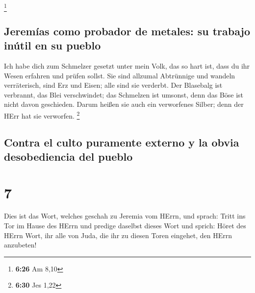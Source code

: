 \footnote{\textbf{6:26} Am 8,10}

\hypertarget{jeremuxedas-como-probador-de-metales-su-trabajo-inuxfatil-en-su-pueblo}{%
\subsection{Jeremías como probador de metales: su trabajo inútil en su
pueblo}\label{jeremuxedas-como-probador-de-metales-su-trabajo-inuxfatil-en-su-pueblo}}

 Ich habe dich zum Schmelzer gesetzt unter mein Volk, das
so hart ist, dass du ihr Wesen erfahren und prüfen sollst.
 Sie sind allzumal Abtrünnige und wandeln verräterisch,
sind Erz und Eisen; alle sind sie verderbt.  Der
Blasebalg ist verbrannt, das Blei verschwindet; das Schmelzen ist
umsonst, denn das Böse ist nicht davon geschieden.  Darum
heißen sie auch ein verworfenes Silber; denn der HErr hat sie verworfen.
\footnote{\textbf{6:30} Jes 1,22}

\hypertarget{contra-el-culto-puramente-externo-y-la-obvia-desobediencia-del-pueblo}{%
\subsection{Contra el culto puramente externo y la obvia desobediencia
del
pueblo}\label{contra-el-culto-puramente-externo-y-la-obvia-desobediencia-del-pueblo}}

\hypertarget{section-6}{%
\section{7}\label{section-6}}

 Dies ist das Wort, welches geschah zu Jeremia vom HErrn,
und sprach:  Tritt ins Tor im Hause des HErrn und predige
daselbst dieses Wort und sprich: Höret des HErrn Wort, ihr alle von
Juda, die ihr zu diesen Toren eingehet, den HErrn anzubeten!


